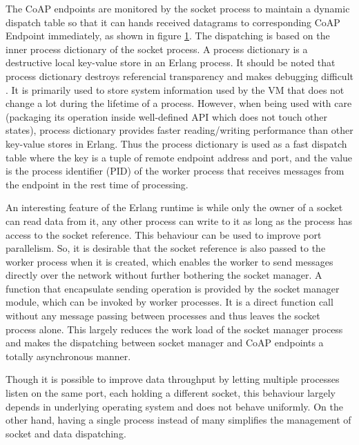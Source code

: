 The CoAP endpoints are monitored by the socket process to maintain a dynamic dispatch table so that it can hands received datagrams to corresponding CoAP Endpoint immediately, as shown in figure \ref{fig:coap_socket_manager}. The dispatching is based on the inner process dictionary of the socket process. A process dictionary is a destructive local key-value store in an Erlang process. It should be noted that process dictionary destroys referencial transparency and makes debugging difficult \cite{}. It is primarily used to store system information used by the VM that does not change a lot during the lifetime of a process. However, when being used with care (packaging its operation inside well-defined API which does not touch other states), process dictionary provides faster reading/writing performance than other key-value stores in Erlang. Thus the process dictionary is used as a fast dispatch table where the key is a tuple of remote endpoint address and port, and the value is the process identifier (PID) of the worker process that receives messages from the endpoint in the rest time of processing. 

\begin{figure}
\label{fig:coap_socket_manager}
\end{figure}

An interesting feature of the Erlang runtime is while only the owner of a socket can read data from it, any other process can write to it as long as the process has access to the socket reference. This behaviour can be used to improve port parallelism. So, it is desirable that the socket reference is also passed to the worker process when it is created, which enables the worker to send messages directly over the network without further bothering the socket manager. A function that encapsulate sending operation is provided by the socket manager module, which can be invoked by worker processes. It is a direct function call without any message passing between processes and thus leaves the socket process alone. This largely reduces the work load of the socket manager process and makes the dispatching between socket manager and CoAP endpoints a totally asynchronous manner.

Though it is possible to improve data throughput by letting multiple processes listen on the same port, each holding a different socket, this behaviour largely depends in underlying operating system and does not behave uniformly. On the other hand, having a single process instead of many simplifies the management of socket and data dispatching.

